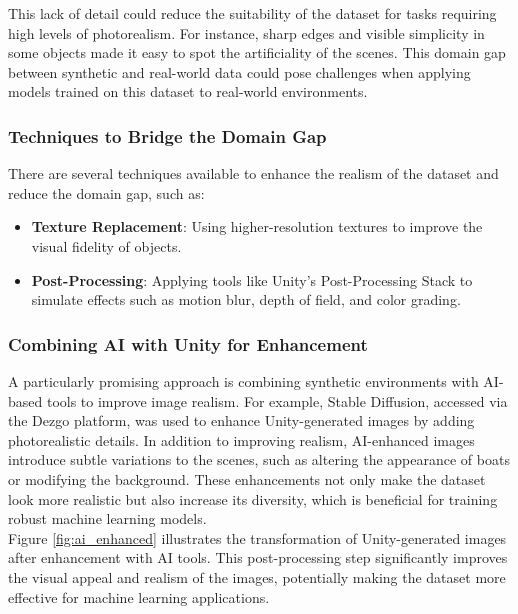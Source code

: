\noindent This lack of detail could reduce the suitability of the dataset for tasks requiring high levels of photorealism. For instance, sharp edges and visible simplicity in some objects made it easy to spot the artificiality of the scenes. This domain gap between synthetic and real-world data could pose challenges when applying models trained on this dataset to real-world environments.

\subsubsection{Techniques to Bridge the Domain Gap}
There are several techniques available to enhance the realism of the dataset and reduce the domain gap, such as:

\begin{itemize}
\item \textbf{Texture Replacement}: Using higher-resolution textures to improve the visual fidelity of objects.
\item \textbf{Post-Processing}: Applying tools like Unity's Post-Processing Stack to simulate effects such as motion blur, depth of field, and color grading.

\end{itemize}

\subsubsection{Combining AI with Unity for Enhancement}
A particularly promising approach is combining synthetic environments with AI-based tools to improve image realism. For example, Stable Diffusion, accessed via the Dezgo platform, was used to enhance Unity-generated images by adding photorealistic details. In addition to improving realism, AI-enhanced images introduce subtle variations to the scenes, such as altering the appearance of boats or modifying the background. These enhancements not only make the dataset look more realistic but also increase its diversity, which is beneficial for training robust machine learning models.\\

\noindent Figure \ref{fig:ai_enhanced} illustrates the transformation of Unity-generated images after enhancement with AI tools. This post-processing step significantly improves the visual appeal and realism of the images, potentially making the dataset more effective for machine learning applications.


